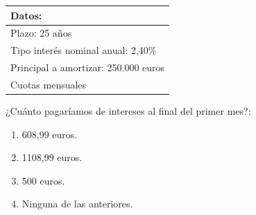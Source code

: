 \documentclass[
  letterpaper,
  DIV=11,
  numbers=noendperiod]{scrreprt}
\begin{document}
\begin{longtable}[]{@{}l@{}}
\toprule()
\textbf{Datos:} \\
\midrule()
\endhead
Plazo: 25 años \\
Tipo interés nominal anual: 2,40\% \\
Principal a amortizar: 250.000 euros \\
Cuotas mensuales \\
\bottomrule()
\end{longtable}

¿Cuánto pagaríamos de intereses al final del primer mes?:

\begin{enumerate}
\def\labelenumi{\alph{enumi})}
\item
  608,99 euros.
\item
  1108,99 euros.
\item
  500 euros.
\item
  Ninguna de las anteriores.
\end{enumerate}
\end{document}
